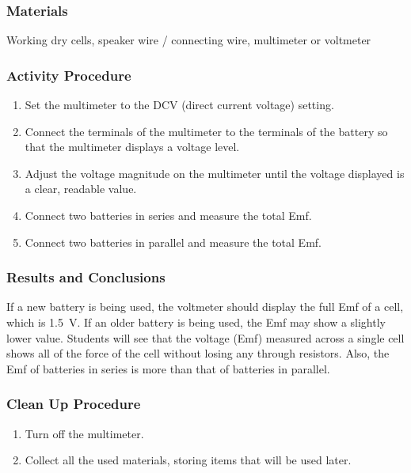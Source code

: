 \subsubsection*{Materials}
Working dry cells, speaker wire / connecting wire, multimeter or voltmeter



\subsubsection*{Activity Procedure}
\begin{enumerate}
\item{Set the multimeter to the DCV (direct current voltage) setting.} 
\item{Connect the terminals of the multimeter to the terminals of the battery so that the multimeter displays a voltage level.} 
\item{Adjust the voltage magnitude on the multimeter until the voltage displayed is a clear, readable value.} 
\item{Connect two batteries in series and measure the total Emf.}
\item{Connect two batteries in parallel and measure the total Emf.}
\end{enumerate}

\subsubsection*{Results and Conclusions}
If a new battery is being used, the voltmeter should display the full Emf of a cell, which is 1.5~V. If an older battery is being used, the Emf may show a slightly lower value. Students will see that the voltage (Emf) measured across a single cell shows all of the force of the cell without losing any through resistors. Also, the Emf of batteries in series is more than that of batteries in parallel.

\subsubsection*{Clean Up Procedure}
\begin{enumerate}
\item{Turn off the multimeter.} 
\item{Collect all the used materials, storing items that will be used later.} 
\end{enumerate}

